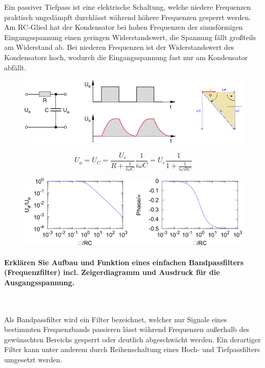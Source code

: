 \documentclass[a4paper, 11pt, parskip=half]{scrartcl}
\begin{document}
Ein passiver Tiefpass ist eine elektrische Schaltung, welche niedere Frequenzen praktisch ungedämpft
durchlässt während höhere Frequenzen gesperrt werden. Am RC-Glied hat der Kondensator bei hohen
Frequenzen der sinusförmigen Eingangsspannung einen geringen Widerstandswert, die Spannung fällt
großteils am Widerstand ab. Bei niederen Frequenzen ist der Widerstandswert des Kondensators hoch,
wodurch die Eingangsspannung fast nur am Kondensator abfällt.

\begin{figure}[H]
    \centering
    \includegraphics[width=12cm]{image/10/4.1}
\end{figure}
\begin{equation}
    U_a
    = U_C
    = \frac{U_e}{R + \frac{1}{i \omega C}} \frac{1}{i \omega C}
    = U_e \frac{1}{1 + \frac{1}{i \omega R C}}
\end{equation}
\begin{figure}[H]
    \centering
    \includegraphics[width=12cm]{image/10/4.2}
\end{figure}

\paragraph{Erklären Sie Aufbau und Funktion eines einfachen Bandpassfilters (Frequenzfilter) incl.
Zeigerdiagramm und Ausdruck für die Ausgangsspannung.} ~

Als Bandpassfilter wird ein Filter bezeichnet, welcher nur Signale eines bestimmten Frequenzbands
passieren lässt während Frequenzen außerhalb des gewünschten Bereichs gesperrt oder deutlich
abgeschwächt werden. Ein derartiger Filter kann unter anderem durch Reihenschaltung eines Hoch- und
Tiefpassfilters umgesetzt werden.
\end{document}
